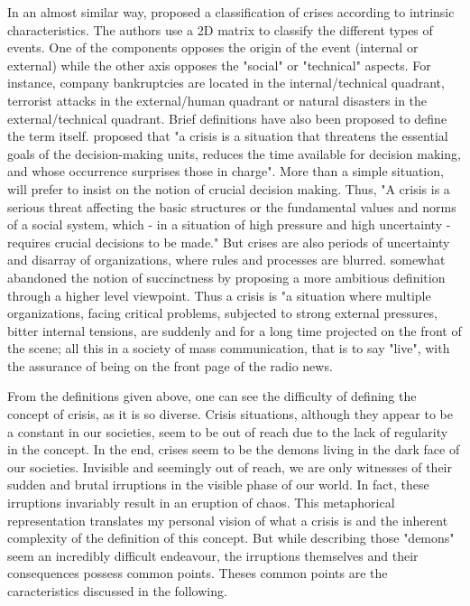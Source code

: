 In an almost similar way, \textcite{mitroffStructureManmadeOrganizational1988} proposed a classification of crises according to intrinsic characteristics.
The authors use a 2D matrix to classify the different types of events.
One of the components opposes the origin of the event (internal or external) while the other axis opposes the "social" or "technical" aspects.
For instance, company bankruptcies are located in the internal/technical quadrant, terrorist attacks in the external/human quadrant or natural disasters in the external/technical quadrant.
Brief definitions have also been proposed to define the term itself.
\textcite{hermannIssuesStudyInternational1972} proposed that "a crisis is a situation that threatens the essential goals of the decision-making units,
reduces the time available for decision making, and whose occurrence surprises those in charge".
More than a simple situation, \textcite{rosenthalCrisisDecisionMakingNetherlands1986} will prefer to insist on the notion of crucial decision making.
Thus, "A crisis is a serious threat affecting the basic structures or the fundamental values and norms of a social system,
which - in a situation of high pressure and high uncertainty - requires crucial decisions to be made."
But crises are also periods of uncertainty and disarray of organizations, where rules and processes are blurred.
\textcite{lagadecGESTIONCRISES1994} somewhat abandoned the notion of succinctness by proposing a more ambitious definition through a higher level viewpoint.
Thus a crisis is "a situation where multiple organizations, facing critical problems, subjected to strong external pressures, bitter internal tensions, are suddenly and for a long time projected on the front of the scene;
all this in a society of mass communication, that is to say "live", with the assurance of being on the front page of the radio news.

From the definitions given above, one can see the difficulty of defining the concept of crisis, as it is so diverse.
Crisis situations, although they appear to be a constant in our societies, seem to be out of reach due to the lack of regularity in the concept.
In the end, crises seem to be the demons living in the dark face of our societies.
Invisible and seemingly out of reach, we are only witnesses of their sudden and brutal irruptions in the visible phase of our world.
In fact, these irruptions invariably result in an eruption of chaos.
This metaphorical representation translates my personal vision of what a crisis is and the inherent complexity of the definition of this concept.
But while describing those "demons" seem an incredibly difficult endeavour, the irruptions themselves and their consequences possess common points.
Theses common points are the caracteristics discussed in the following.

